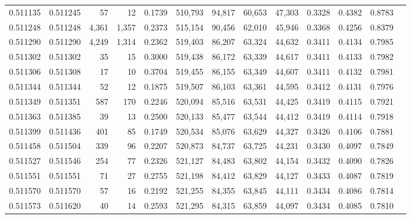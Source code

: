 \begin{tabular}{rrrrrrrrrrrrr}
0.511135 & 0.511245 &    57 &    12 &                                     0.1739 & 510,793 &  94,817 &  60,653 &  47,303 & 0.3328 & 0.4382 & 0.8783 \\
0.511248 & 0.511248 & 4,361 & 1,357 &                                     0.2373 & 515,154 &  90,456 &  62,010 &  45,946 & 0.3368 & 0.4256 & 0.8379 \\
0.511290 & 0.511290 & 4,249 & 1,314 &                                     0.2362 & 519,403 &  86,207 &  63,324 &  44,632 & 0.3411 & 0.4134 & 0.7985 \\
0.511302 & 0.511302 &    35 &    15 &                                     0.3000 & 519,438 &  86,172 &  63,339 &  44,617 & 0.3411 & 0.4133 & 0.7982 \\
0.511306 & 0.511308 &    17 &    10 &                                     0.3704 & 519,455 &  86,155 &  63,349 &  44,607 & 0.3411 & 0.4132 & 0.7981 \\
0.511344 & 0.511344 &    52 &    12 &                                     0.1875 & 519,507 &  86,103 &  63,361 &  44,595 & 0.3412 & 0.4131 & 0.7976 \\
0.511349 & 0.511351 &   587 &   170 &                                     0.2246 & 520,094 &  85,516 &  63,531 &  44,425 & 0.3419 & 0.4115 & 0.7921 \\
0.511363 & 0.511385 &    39 &    13 &                                     0.2500 & 520,133 &  85,477 &  63,544 &  44,412 & 0.3419 & 0.4114 & 0.7918 \\
0.511399 & 0.511436 &   401 &    85 &                                     0.1749 & 520,534 &  85,076 &  63,629 &  44,327 & 0.3426 & 0.4106 & 0.7881 \\
0.511458 & 0.511504 &   339 &    96 &                                     0.2207 & 520,873 &  84,737 &  63,725 &  44,231 & 0.3430 & 0.4097 & 0.7849 \\
0.511527 & 0.511546 &   254 &    77 &                                     0.2326 & 521,127 &  84,483 &  63,802 &  44,154 & 0.3432 & 0.4090 & 0.7826 \\
0.511551 & 0.511551 &    71 &    27 &                                     0.2755 & 521,198 &  84,412 &  63,829 &  44,127 & 0.3433 & 0.4087 & 0.7819 \\
0.511570 & 0.511570 &    57 &    16 &                                     0.2192 & 521,255 &  84,355 &  63,845 &  44,111 & 0.3434 & 0.4086 & 0.7814 \\
0.511573 & 0.511620 &    40 &    14 &                                     0.2593 & 521,295 &  84,315 &  63,859 &  44,097 & 0.3434 & 0.4085 & 0.7810 \\

\end{tabular}
